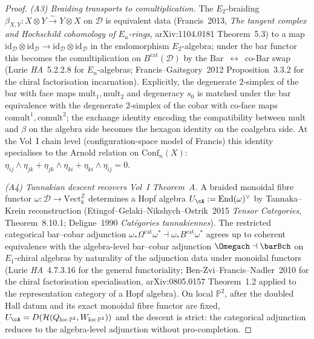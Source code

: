 \begin{proof}
\textit{(A3) Braiding transports to comultiplication.}\enspace
The $E_2$-braiding
$\beta_{X,Y} : X \otimes Y \xrightarrow{\sim} Y \otimes X$ on
$\mathcal D$ is equivalent data (Francis~2013, \emph{The tangent
complex and Hochschild cohomology of $E_n$-rings}, arXiv:1104.0181
Theorem~5.3) to a map $\mathrm{id}_{\mathcal D} \otimes
\mathrm{id}_{\mathcal D} \to \mathrm{id}_{\mathcal D} \otimes
\mathrm{id}_{\mathcal D}$ in the endomorphism $E_2$-algebra; under the
bar functor this becomes the comultiplication on
$B^{\mathrm{cat}}(\mathcal D)$ by the Bar~$\leftrightarrow$~co-$\!$Bar
swap (Lurie \emph{HA}~5.2.2.8 for $E_n$-algebras;
Francis--Gaitsgory~2012 Proposition~3.3.2 for the chiral
factorisation incarnation). Explicitly, the degenerate $2$-simplex
of the bar with face maps $\mathrm{mult}_1, \mathrm{mult}_2$ and
degeneracy $s_0$ is matched under the bar equivalence with the
degenerate $2$-simplex of the cobar with co-face maps
$\mathrm{comult}^1, \mathrm{comult}^2$; the exchange identity
encoding the compatibility between $\mathrm{mult}$ and $\beta$ on
the algebra side becomes the hexagon identity on the coalgebra side.
At the Vol~I chain level (configuration-space model of Francis) this
identity specialises to the Arnold relation on
$\mathrm{Conf}_n(X)$: $\eta_{ij}\wedge\eta_{jk} + \eta_{jk}\wedge\eta_{ki}
+ \eta_{ki}\wedge\eta_{ij} = 0$.

\textit{(A4) Tannakian descent recovers Vol~I Theorem~A.}\enspace
A braided monoidal fibre functor
$\omega : \mathcal D \to \mathrm{Vect}_k^{\mathbb Z}$ determines a
Hopf algebra $U_{\cA} := \mathrm{End}(\omega)^\vee$ by Tannaka--Krein
reconstruction (Etingof--Gelaki--Nikshych--Ostrik~2015 \emph{Tensor
Categories}, Theorem~8.10.1; Deligne~1990 \emph{Cat\'egories
tannakiennes}). The restricted categorical bar--cobar adjunction
$\omega_* \Omega^{\mathrm{cat}} \omega^* \dashv \omega_* B^{\mathrm{cat}} \omega^*$
agrees up to coherent equivalence with the algebra-level bar--cobar
adjunction $\Omegach \dashv \barBch$ on $E_1$-chiral algebras by
naturality of the adjunction data under monoidal functors
(Lurie \emph{HA}~4.7.3.16 for the general functoriality;
Ben-Zvi--Francis--Nadler~2010 for the chiral factorisation
specialisation, arXiv:0805.0157 Theorem~1.2 applied to the
representation category of a Hopf algebra). On local $\mathbb P^2$,
after the doubled Hall datum and its exact monoidal fibre functor are
fixed, \(U_{\cA}=D(\mathcal H(Q_{\mathrm{loc}\,\mathbb P^2},
W_{\mathrm{loc}\,\mathbb P^2}))\) and the descent is strict: the
categorical adjunction reduces to the algebra-level adjunction without
pro-completion.
\end{proof}

